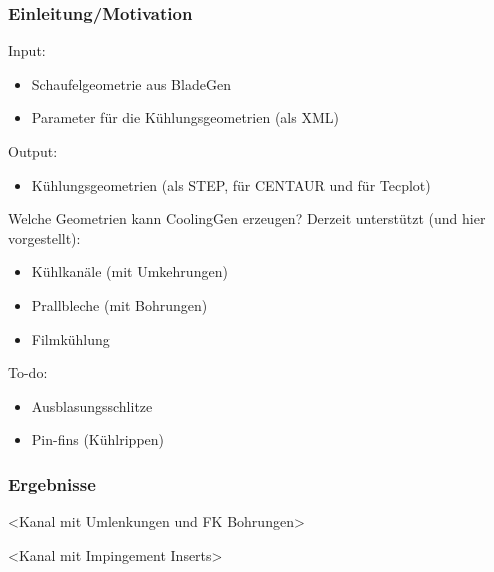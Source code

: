 \documentclass[8pt, aspectratio=169]{beamer}
\begin{document}
\begin{frame}
	\frametitle{Einleitung/Motivation}
	\vspace{-1cm}\hspace{-0.5cm}
	\begin{minipage}[t]{\textwidth}
		Input:
		\begin{itemize}
			\item Schaufelgeometrie aus BladeGen
			\item Parameter für die Kühlungsgeometrien (als XML)
		\end{itemize}
		Output:
		\begin{itemize}
			\item Kühlungsgeometrien (als STEP, für CENTAUR und für Tecplot)
		\end{itemize}

		Welche Geometrien kann CoolingGen erzeugen?
		Derzeit unterstützt (und hier vorgestellt):
		\begin{itemize}
			\item Kühlkanäle (mit Umkehrungen)
			\item Prallbleche (mit Bohrungen)
			\item Filmkühlung
		\end{itemize}

		To-do:
		\begin{itemize}
			\item Ausblasungsschlitze
			\item Pin-fins (Kühlrippen)
		\end{itemize}
	\end{minipage}
	\vfill
\end{frame}

\begin{frame}
	\frametitle{Ergebnisse}
	\vspace{-1cm}\hspace{-0.5cm}
	\begin{minipage}[t]{.69\textwidth}
		\centering
		<Kanal mit Umlenkungen und FK Bohrungen>
	\end{minipage}
	\begin{minipage}[t]{.29\textwidth}
		\centering
		<Kanal mit Impingement Inserts>
	\end{minipage}
	\vfill
\end{frame}
\end{document}
